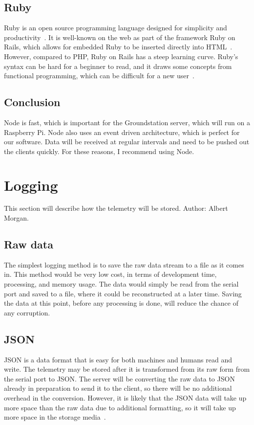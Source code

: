 \documentclass[10pt,draftclsnofoot,onecolumn]{IEEEtran}
\begin{document}
	\subsection{Ruby}
	Ruby is an open source programming language designed for simplicity and productivity~\cite{ruby}.
	It is well-known on the web as part of the framework Ruby on Rails, which allows for embedded Ruby to be inserted directly into HTML~\cite{getting-started-with-rails}.
	However, compared to PHP, Ruby on Rails has a steep learning curve.
	Ruby's syntax can be hard for a beginner to read, and it draws some concepts from functional programming, which can be difficult for a new user~\cite{ruby-on-rails-vs-php-the-good-the-bad}.	

	\subsection{Conclusion}
	Node is fast, which is important for the Groundstation server, which will run on a Raspberry Pi.
	Node also uses an event driven architecture, which is perfect for our software. Data will be received at regular intervals and need to be pushed out the clients quickly. For these reasons, I recommend using Node.


	\section{Logging}
	This section will describe how the telemetry will be stored. Author: Albert Morgan.
	\subsection{Raw data}
	The simplest logging method is to save the raw data stream to a file as it comes in.
	This method would be very low cost, in terms of development time, processing, and memory usage.
	The data would simply be read from the serial port and saved to a file, where it could be reconstructed at a later time.
	Saving the data at this point, before any processing is done, will reduce the chance of any corruption.
	
	\subsection{JSON}
	\ac{JSON} is a data format that is easy for both machines and humans read and write.
	The telemetry may be stored after it is transformed from its raw form from the serial port to \ac{JSON}.
	The server will be converting the raw data to \ac{JSON} already in preparation to send it to the client, so there will be no additional overhead in the conversion.
	However, it is likely that the \ac{JSON} data will take up more space than the raw data due to additional formatting, so it will take up more space in the storage media~\cite{json}.
	
\end{document}
